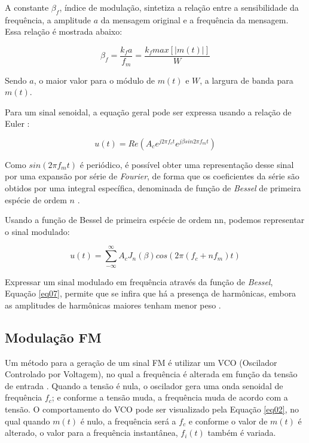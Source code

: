 A constante $\beta_f$, índice de modulação, sintetiza a relação entre a sensibilidade da frequência, a amplitude $a$ da mensagem original e a frequência da mensagem. Essa relação é mostrada abaixo:

\begin{equation}
    \beta_f = \frac{k_f a}{f_m} = \frac{k_f max[|m(t)|]}{W}
    \label{eq05}
\end{equation}

Sendo $a$, o maior valor para o módulo de $m(t)$ e $W$, a largura de banda para $m(t)$. 

Para um sinal senoidal, a equação geral pode ser expressa usando a relação de Euler \cite{proakis}:

\begin{equation}
    u(t) = Re(A_c e^{j2\pi f_ct}e^{j\beta sin 2\pi f_mt})
    \label{eq06}
\end{equation}

Como $sin(2\pi f_mt)$ é periódico, é possível obter uma representação desse sinal por uma expansão por série de \textit{Fourier}, de forma que os coeficientes da série são obtidos por uma integral específica, denominada de função de \textit{Bessel} de primeira espécie de ordem $n$ \cite{proakis}.

Usando a função de Bessel de primeira espécie de ordem nn, podemos representar o sinal modulado:

\begin{equation}
    u(t) = \sum_{-\infty}^{\infty} A_c J_n (\beta) cos(2\pi(f_c + nf_m)t) 
    \label{eq07}
\end{equation}

Expressar um sinal modulado em frequência através da função de \textit{Bessel}, Equação \ref{eq07}, permite que se infira que há a presença de harmônicas, embora as amplitudes de harmônicas maiores tenham menor peso \cite{proakis}. 

\subsection{Modulação FM}
Um método para a geração de um sinal FM é utilizar um VCO (Oscilador Controlado por Voltagem), no qual a frequência é alterada em função da tensão de entrada \cite{proakis}. Quando a tensão é nula, o oscilador gera uma onda senoidal de frequência $f_c$; e conforme a tensão muda, a frequência muda de acordo com a tensão. O comportamento do VCO pode ser visualizado pela Equação \ref{eq02}, no qual quando $m(t)$ é nulo, a frequência será a $f_c$ e conforme o valor de $m(t)$ é alterado, o valor para a frequência instantânea, $f_i (t)$ também é variada. 

